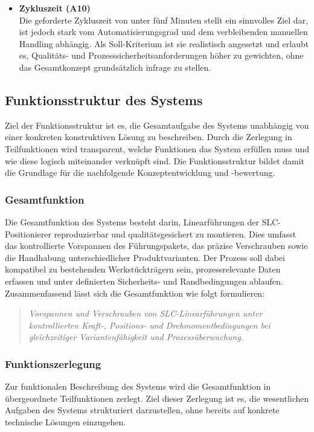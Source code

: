 \begin{itemize}
    \item \textbf{Zykluszeit (A10)} \\
    Die geforderte Zykluszeit von unter fünf Minuten stellt ein sinnvolles Ziel dar, ist jedoch stark vom Automatisierungsgrad und dem verbleibenden manuellen Handling abhängig. Als Soll-Kriterium ist sie realistisch angesetzt und erlaubt es, Qualitäts- und Prozesssicherheitsanforderungen höher zu gewichten, ohne das Gesamtkonzept grundsätzlich infrage zu stellen.
\end{itemize}

\subsection{Funktionsstruktur des Systems}
Ziel der Funktionsstruktur ist es, die Gesamtaufgabe des Systems unabhängig von einer konkreten konstruktiven Lösung zu beschreiben. Durch die Zerlegung in Teilfunktionen wird transparent, welche Funktionen das System erfüllen muss und wie diese logisch miteinander verknüpft sind. Die Funktionsstruktur bildet damit die Grundlage für die nachfolgende Konzeptentwicklung und -bewertung.

\subsubsection{Gesamtfunktion}
Die Gesamtfunktion des Systems besteht darin, Linearführungen der SLC-Positionierer reproduzierbar und qualitätsgesichert zu montieren. Dies umfasst das kontrollierte Vorspannen des Führungspakets, das präzise Verschrauben sowie die Handhabung unterschiedlicher Produktvarianten. Der Prozess soll dabei kompatibel zu bestehenden Werkstückträgern sein, prozessrelevante Daten erfassen und unter definierten Sicherheits- und Randbedingungen ablaufen.\\
Zusammenfassend lässt sich die Gesamtfunktion wie folgt formulieren:
\begin{quote}
\textit{Vorspannen und Verschrauben von SLC-Linearführungen unter kontrollierten Kraft-, Positions- und Drehmomentbedingungen bei gleichzeitiger Variantenfähigkeit und Prozessüberwachung.}
\end{quote}

\subsubsection{Funktionszerlegung}
Zur funktionalen Beschreibung des Systems wird die Gesamtfunktion in übergeordnete Teilfunktionen zerlegt. Ziel dieser Zerlegung ist es, die wesentlichen Aufgaben des Systems strukturiert darzustellen, ohne bereits auf konkrete technische Lösungen einzugehen.

